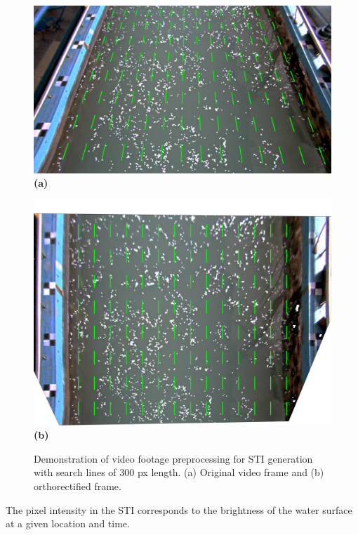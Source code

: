 \documentclass[12pt]{elsarticle}
\begin{document}
\begin{figure}[!htbp]
    \centering
    \begin{minipage}[b]{0.54\textwidth}
        \centering
        \includegraphics[width=\textwidth]{plots/STI_display_normal.jpg}
        \textbf{(a)} 
    \end{minipage}
    \hfill
    \begin{minipage}[b]{0.43\textwidth}
        \centering
        \includegraphics[width=\textwidth]{plots/STI_display_ortho.jpg}
        \textbf{(b)} 
    \end{minipage}
    \caption{Demonstration of video footage preprocessing for STI generation with search lines of 300 px length. (a) Original video frame and (b) orthorectified frame.}
    \label{fig:STI_examples}
\end{figure}

The pixel intensity in the STI corresponds to the brightness of the water surface at a given location and time.
\end{document}
